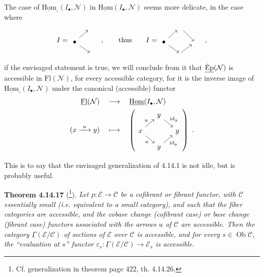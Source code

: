 \documentclass[11pt]{article}
\newcommand{\printedpage}[1]{\marginpar{\footnotesize p.~#1}}
\newcommand{\msp}[1]{\marginpar{\footnotesize [#1]}}
\newcommand{\uHom}{\underline{\mathrm{Hom}}}
\newcommand{\uFl}{\underline{\mathrm{Fl}}}
\newcommand{\uEp}{\underline{\textup{Ép}}}
\newcommand{\uGamma}{\underline{\Gamma}}
\newcommand{\Ob}{\operatorname{Ob}}
\begin{document}
The case of $\uHom_{\square}(I_\bullet,\mathcal{N})$ in $\uHom(I_\bullet,\mathcal{N})$ seems more delicate, in the case where
\msp{page 390}
\[
I = 
\begin{tikzcd}[sep=small]
 & {} \\
\bullet \arrow[ur] \arrow[dr] & \\
 & {}
\end{tikzcd}
\quad , \qquad \text{thus} \qquad
I = 
\begin{tikzcd}[sep=small]
 & {} \arrow[dr] & \\
\bullet \arrow[ur] \arrow[dr] & & {} \\
 & {} \arrow[ur] &
\end{tikzcd}
\quad ,
\]
if the envisaged statement is true, we will conclude from it that $\uEp(\mathcal{N})$ is accessible in $\uFl(\mathcal{N})$, for every accessible category, for it is the inverse image of $\uHom_{\square}(I_\bullet,\mathcal{N})$ under the canonical (accessible) functor
\[
\begin{aligned}
\uFl(\mathcal{N}) \quad &\longrightarrow \quad \uHom(I_\bullet,\mathcal{N}) \\
(x \xrightarrow{\ u\ } y) \quad &\longmapsto \quad
\left(
\begin{tikzcd}[sep=small, ampersand replacement=\&]
 \& y \arrow[dr, "\mathrm{id}_y"] \& \\
x \arrow[ur, "u"] \arrow[dr, "u"'] \& \& y \\
 \& y \arrow[ur, "\mathrm{id}_y"'] \&
\end{tikzcd}
\right) \ .
\end{aligned}
\]

\printedpage{148}

This is to say that the envisaged generalization of 4.14.1 is not idle, but is probably useful.

\msp{page 391}
\textbf{Theorem 4.14.17} (\footnote[168]{Cf. generalization in theorem page 422, th. 4.14.26.}). \textit{Let $p : \mathcal{E} \longrightarrow \mathcal{C}$ be a cofibrant or fibrant functor, with $\mathcal{C}$ essentially small (i.e. equivalent to a small category), and such that the fiber categories are accessible, and the cobase change (cofibrant case) or base change (fibrant case) functors associated with the arrows $u$ of $\mathcal{C}$ are accessible. Then the category $\uGamma(\mathcal{E}/\mathcal{C})$ of sections of $\mathcal{E}$ over $\mathcal{C}$ is accessible, and for every $s \in \Ob\mathcal{C}$, the ``evaluation at $s$'' functor $\varepsilon_s : \uGamma(\mathcal{E}/\mathcal{C}) \longrightarrow \mathcal{E}_s$ is accessible.}
\end{document}
